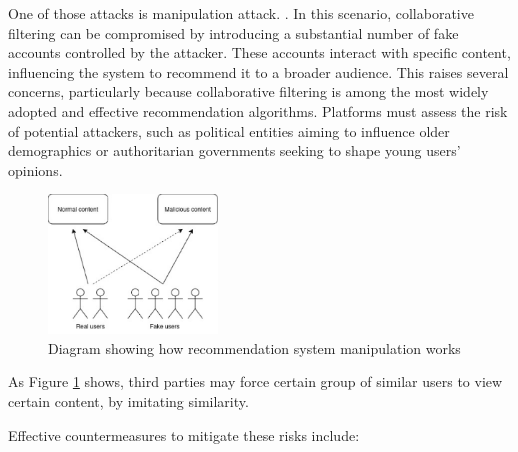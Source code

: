 \documentclass[10pt,twocolumn,twoside,a4paper]{article} %
\begin{document}
One of those attacks is manipulation attack. \cite{ManipulationAttacks}. In this scenario, collaborative filtering can be compromised by introducing a substantial number of fake accounts controlled by the attacker. These accounts interact with specific content, influencing the system to recommend it to a broader audience. This raises several concerns, particularly because collaborative filtering is among the most widely adopted and effective recommendation algorithms. Platforms must assess the risk of potential attackers, such as political entities aiming to influence older demographics or authoritarian governments seeking to shape young users' opinions.

\begin{figure}[h!]
    \centering
    \includegraphics[width=0.4\textwidth, height=0.3\textheight]{manipulation.eps}
    \caption{Diagram showing how recommendation system manipulation works}
    \label{fig:recommendation_manipulation}
\end{figure}

As Figure \ref{fig:recommendation_manipulation} shows, third parties may force certain group of similar users to view certain content, by imitating similarity.

Effective countermeasures \cite{ManipulationAttacks} to mitigate these risks include:
\end{document}

